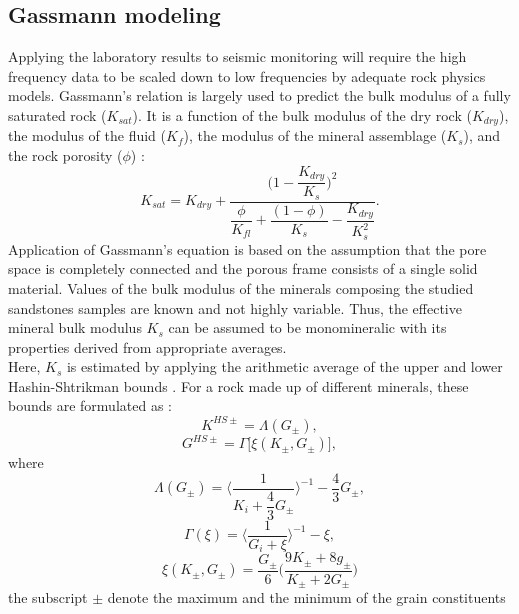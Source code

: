 \subsection{Gassmann modeling}
Applying the laboratory results to seismic monitoring will require the high
frequency data to be scaled down to low frequencies by adequate rock physics
models. Gassmann's relation is largely used to predict the bulk modulus of a
fully saturated rock ($K_{sat}$).  It is a function of the bulk modulus of the
dry rock ($K_{dry}$), the modulus of the fluid ($K_f$), the modulus of the
mineral assemblage ($K_s$), and the rock porosity ($\phi$) \cite{Gassmann}:
\begin{equation}
\label{eq:Kdry}
K_{sat} = K_{dry} +
\dfrac{\bigg(1-\dfrac{K_{dry}}{K_s}\bigg)^2}{\dfrac{\phi}{K_{fl}}+\dfrac{(1-\phi)}{K_s}-\dfrac{K_{dry}}{K^2_s}}.
\end{equation}
Application of Gassmann's equation is based on the assumption that the pore
space is completely connected and the porous frame consists of a single solid
material. Values of the bulk modulus of the minerals composing the studied
sandstones samples are known and not highly variable.  Thus, the effective
mineral bulk modulus $K_s$ can be assumed to be monomineralic with its
properties derived from appropriate averages.\\
Here, $K_s$ is estimated by applying the arithmetic average of the upper and
lower Hashin-Shtrikman bounds \citep{Hashin1963}. For a rock made up of
different minerals, these bounds are formulated as \citep{Barryman1995}:
\begin{equation}
\label{eq:Ks}
K^{HS\pm} = \Lambda(G_{\pm}),
\end{equation}
\begin{equation}
\label{eq:Gs}
G^{HS\pm} = \Gamma \big[\xi(K_{\pm},G_{\pm})\big],
\end{equation}
where
\begin{equation}
\Lambda(G_{\pm}) = \Bigg\langle \dfrac{1}{K_i + \dfrac{4}{3} G_{\pm}}
\Bigg\rangle^{-1}-\dfrac{4}{3}G_{\pm},
\end{equation}
\begin{equation}
\Gamma (\xi) = \bigg\langle\dfrac{1}{G_i + \xi} \bigg\rangle^{-1}-\xi,
\end{equation}
\begin{equation}
\xi(K_{\pm},G_{\pm}) = \dfrac{G_{\pm}}{6}
\bigg(\dfrac{9K_{\pm}+8g_{\pm}}{K_{\pm}+2G_{\pm}}\bigg)
\end{equation}
the subscript $\pm$ denote the maximum and the minimum of the grain constituents

